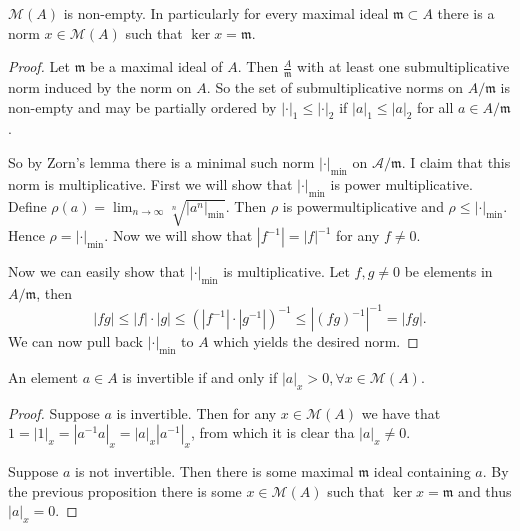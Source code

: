 \begin{proposition}
	$\mathcal{M} (A)$ is non-empty. 
	In particularly for every maximal ideal $\mathfrak{m}  \subset  A$ there is a norm $x \in \mathcal{M} (A)$ such that $\ker x = \mathfrak{m} $.
\end{proposition}
\begin{proof}
	Let $\mathfrak{m}$ be a maximal ideal of $A$. 
	Then $\frac{A}{\mathfrak{m} }$ with at least one submultiplicative norm induced by the norm on  $A$. 
	So the set of submultiplicative norms on  $A/\mathfrak{m} $ is non-empty and may be partially ordered by $|\cdot |_1 \le |\cdot |_2$ if $|a|_1 \le |a|_2$ for all $a \in A / \mathfrak{m} $. 

	So by Zorn's lemma there is a minimal such norm $|\cdot |_\text{min} $ on $\mathcal{A}  / \mathfrak{m} $. 
	I claim that this norm is multiplicative. 
	First we will show that $|\cdot |_\text{min} $ is power multiplicative. 
	Define $\rho(a) = \lim_{n \to \infty} \sqrt[n]{|a^{n}|_\text{min} } $. Then $\rho$ is powermultiplicative and $\rho \le |\cdot |_\text{min} $. Hence $\rho = |\cdot |_\text{min} $. 
	Now we will show that $|f^{-1}| = |f|^{-1}$ for any $f \ne 0$. 

	Now we can easily show that $|\cdot |_\text{min} $ is multiplicative. 
	Let $f, g \ne 0$ be elements in $A / \mathfrak{m} $, then \[
		|fg| \le |f|\cdot |g| \le (|f^{-1}| \cdot |g^{-1}|)^{-1} \le |(fg)^{-1}|^{-1} = |fg|. 
	\]
	We can now pull back $|\cdot |_\text{min} $ to $A$ which yields the desired norm. 
\end{proof}

\begin{corollary}\label{cor:non_vanish_invertible}
	An element $a \in A$ is invertible if and only if $|a|_x > 0, \forall x \in \mathcal{M} (A)$.
\end{corollary}
\begin{proof}
	\ltr
	Suppose $a $ is invertible. Then for any  $x \in \mathcal{M} (A)$ we have that $1 = |1|_x = |a^{-1}a|_x = |a|_x |a^{-1}|_x$, from which it is clear tha $|a|_x \ne 0$. 

	\rtl Suppose $a$ is not invertible. Then there is some maximal $\mathfrak{m}  $ ideal containing $a$. 
	By the previous proposition there is some $x \in \mathcal{M} (A)$ such that $\ker x = \mathfrak{m} $ and thus $|a|_x = 0$. 
\end{proof}

